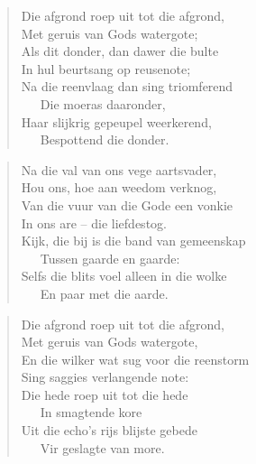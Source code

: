 \begin{verse}
Die afgrond roep uit tot die afgrond, \\ 
Met geruis van Gods watergote; \\ 
Als dit donder, dan dawer die bulte \\ 
In hul beurtsang op reusenote; \\ 
Na die reenvlaag dan sing triomferend \\ 
\ \ \ Die moeras daaronder, \\ 
Haar slijkrig gepeupel weerkerend, \\ 
\ \ \ Bespottend die donder. \\ 
\end{verse}

\begin{verse}
Na die val van ons vege aartsvader, \\ 
Hou ons, hoe aan weedom verknog, \\ 
Van die vuur van die Gode een vonkie \\ 
In ons are -- die liefdestog. \\ 
Kijk, die bij is die band van gemeenskap \\ 
\ \ \ Tussen gaarde en gaarde: \\ 
Selfs die blits voel alleen in die wolke \\ 
\ \ \ En paar met die aarde. \\ 
\end{verse}

\begin{verse}
Die afgrond roep uit tot die afgrond, \\ 
Met geruis van Gods watergote, \\ 
En die wilker wat sug voor die reenstorm \\ 
Sing saggies verlangende note: \\ 
Die hede roep uit tot die hede \\ 
\ \ \ In smagtende kore \\ 
Uit die echo’s rijs blijste gebede \\ 
\ \ \ Vir geslagte van more. \\ 
\end{verse}
